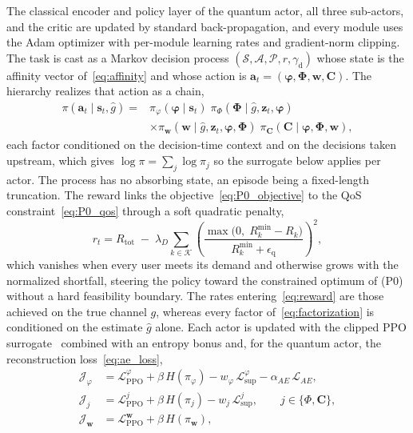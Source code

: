 \documentclass[12pt,onecolumn]{IEEEtran}
\begin{document}
The classical encoder and policy layer of the quantum actor, all three sub-actors, and the critic are updated by standard back-propagation, and every module uses the Adam optimizer with per-module learning rates and gradient-norm clipping.
\else
The task is cast as a Markov decision process $(\mathcal{S},\mathcal{A},\mathcal{P},r,\gamma_{\mathrm d})$
whose state is the affinity vector of~\eqref{eq:affinity} and whose action is
$\mathbf{a}_t=(\boldsymbol{\varphi},\boldsymbol{\Phi},\mathbf{w},\mathbf{C})$. The
hierarchy realizes that action as a chain,
\begin{equation}
\begin{aligned}
    \pi(\mathbf{a}_t \mid \mathbf{s}_t, \hat{g})
    ={}&
    \pi_{\varphi}(\boldsymbol{\varphi} \mid \mathbf{s}_t)\;
    \pi_{\Phi}(\boldsymbol{\Phi} \mid \hat{g}, \mathbf{z}_t, \boldsymbol{\varphi})
    \\[1mm]
    &\times
    \pi_{\mathbf{w}}(\mathbf{w} \mid \hat{g}, \mathbf{z}_t, \boldsymbol{\varphi}, \boldsymbol{\Phi})\;
    \pi_{\mathbf{C}}(\mathbf{C} \mid \boldsymbol{\varphi}, \boldsymbol{\Phi}, \mathbf{w}),
\end{aligned}
    \label{eq:factorization}
\end{equation}
each factor conditioned on the decision-time context and on the decisions taken upstream,
which gives $\log\pi=\sum_j\log\pi_j$ so the surrogate below applies per actor. The process
has no absorbing state, an episode being a fixed-length truncation. The reward links the
objective~\eqref{eq:P0_objective} to the QoS constraint~\eqref{eq:P0_qos} through a soft
quadratic penalty,
\begin{equation}
    r_t
    =
    R_{\mathrm{tot}}
    \;-\;
    \lambda_D \sum_{k \in \mathcal{K}}
    \left(
      \frac{\max\bigl(0,\; R_k^{\min} - R_k\bigr)}{R_k^{\min} + \epsilon_{\mathrm q}}
    \right)^{\!2},
    \label{eq:reward}
\end{equation}
which vanishes when every user meets its demand and otherwise grows with the normalized
shortfall, steering the policy toward the constrained optimum of (P0) without a hard
feasibility boundary. The rates entering~\eqref{eq:reward} are those achieved on the true
channel $g$, whereas every factor of~\eqref{eq:factorization} is conditioned on the
estimate $\hat{g}$ alone. Each actor is updated with the clipped PPO
surrogate~\cite{schulman2017proximal} combined with an entropy bonus and, for the quantum
actor, the reconstruction loss~\eqref{eq:ae_loss},
\begin{equation}
\begin{aligned}
    \mathcal{J}_{\varphi}
    &= \mathcal{L}^{\varphi}_{\mathrm{PPO}} + \beta\,H(\pi_\varphi)
       - w_{\varphi}\,\mathcal{L}^{\varphi}_{\mathrm{sup}}
       - \alpha_{AE}\,\mathcal{L}_{AE}, \\[1mm]
    \mathcal{J}_{j}
    &= \mathcal{L}^{j}_{\mathrm{PPO}} + \beta\,H(\pi_j)
       - w_{j}\,\mathcal{L}^{j}_{\mathrm{sup}},
    \qquad j\in\{\Phi,\mathbf{C}\}, \\[1mm]
    \mathcal{J}_{\mathbf{w}}
    &= \mathcal{L}^{\mathbf{w}}_{\mathrm{PPO}} + \beta\,H(\pi_{\mathbf{w}}),
\end{aligned}
    \label{eq:actor_obj}
\end{equation}
\end{document}
